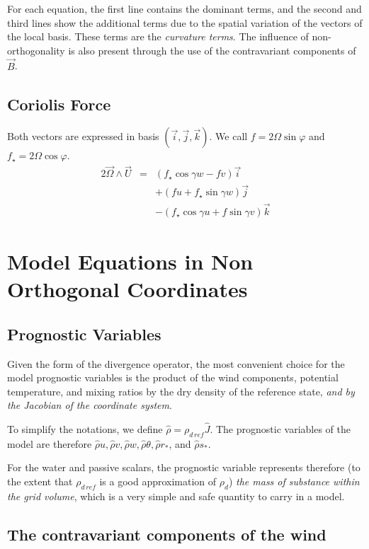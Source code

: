 For each equation, the first line contains the dominant terms, and the
second and third lines show the additional terms due to the spatial
variation of the vectors of the local basis. These terms are the
{\em curvature terms}. The influence of non-orthogonality is also
present through the use of the contravariant components of $\vec{B}$.

\subsection{Coriolis Force}

Both vectors are expressed in basis $(\vec{i},\vec{j},\vec{k})$.
We call $f=2\Omega \sin\varphi$ and $f_{\star}=2\Omega \cos\varphi$.
\begin{eqnarray}
2\vec{\Omega}\wedge\vec{U}&=&(f_{\star} \cos\gamma w - f v ) \vec{i} \nonumber\\
& & + (f u + f_{\star} \sin \gamma w ) \vec{j} \nonumber \\
& & - (f_{\star} \cos\gamma u + f \sin \gamma v ) \vec{k}
\end{eqnarray}

\section{Model Equations in Non Orthogonal Coordinates}
\subsection{Prognostic Variables}
Given the form of the divergence operator, the most convenient choice for the
model prognostic variables is the product of the wind components, potential
temperature, and mixing ratios by the dry density of the reference state,
{\em and by the Jacobian of the coordinate system}.

To simplify the notations, we define $\widehat{\rho}=\rho_{d\,ref}\widehat{J}$.
The prognostic variables of the model are therefore $\widehat{\rho}u,
\widehat{\rho}v, \widehat{\rho}w, \widehat{\rho}\theta, \widehat{\rho}r_{*}$,
and $\widehat{\rho} s_{*}$.

For the water and passive scalars, the prognostic variable represents therefore
(to the extent that $\rho_{d\,ref}$ is a good approximation of $\rho_d$)
{\em the mass of substance within the grid volume}, which is a very simple and
safe quantity to carry in a model.

\subsection{The contravariant components of the wind}

